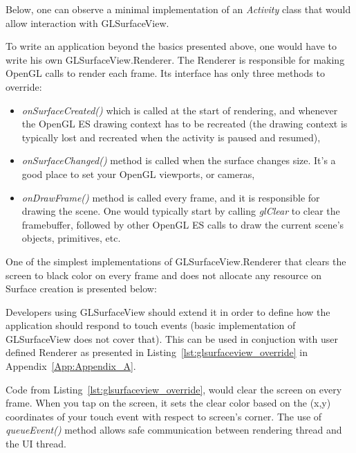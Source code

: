 Below, one can observe a minimal implementation of an \emph{Activity} class \cite{android_activity} that would allow interaction with GLSurfaceView.



To write an application beyond the basics presented above, one would have to write his own GLSurfaceView.Renderer. The Renderer is responsible for making OpenGL calls to render each frame.
Its interface has only three methods to override:

\begin{itemize}
\item \emph{onSurfaceCreated()} which is called at the start of rendering, and whenever the OpenGL ES drawing context has to be recreated (the drawing context is typically lost and recreated when the activity is paused and resumed),
\item \emph{onSurfaceChanged()} method is called when the surface changes size. It's a good place to set your OpenGL viewports, or cameras,
\item \emph{onDrawFrame()} method is called every frame, and it is responsible for drawing the scene. One would typically start by calling \emph{glClear} to clear the framebuffer, followed by other OpenGL ES calls to draw the current scene's objects, primitives, etc.
\end{itemize}

\pagebreak[3]
One of the simplest implementations of GLSurfaceView.Renderer that clears the screen to black color on every frame and does not allocate any resource on Surface creation is presented below:


%

Developers using GLSurfaceView should extend it in order to define how the application should respond to touch events (basic implementation of GLSurfaceView does not cover that). 
This can be used in conjuction with user defined Renderer as presented in Listing~\ref{lst:glsurfaceview_override} in Appendix~\ref{App:Appendix_A}. 

%

Code from Listing~\ref{lst:glsurfaceview_override}, would clear the screen on every frame.
When you tap on the screen, it sets the clear color based on the (x,y) coordinates of your touch event with respect to screen's corner.
The use of \emph{queueEvent()} method allows safe communication between rendering thread and the UI thread.